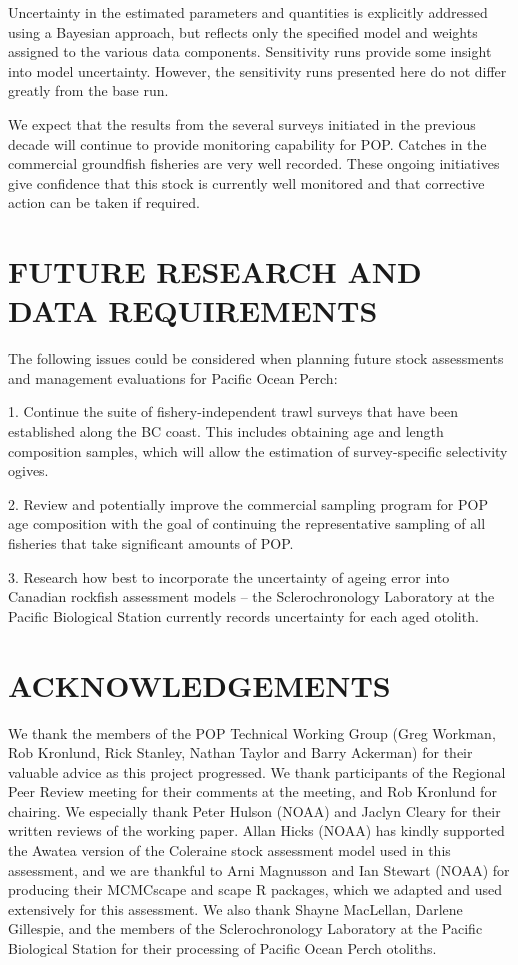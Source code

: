 Uncertainty in the estimated parameters and quantities is explicitly addressed using a Bayesian approach, but reflects only the specified model and weights assigned to the various data components.  Sensitivity runs provide some insight into model uncertainty.  However, the sensitivity runs presented here do not differ greatly from the base run.

We expect that the results from the several surveys initiated in the previous decade will continue to provide monitoring capability for POP. Catches in the commercial groundfish fisheries are very well recorded. These ongoing initiatives give confidence that this stock is currently well monitored and that corrective action can be taken if required.


\section{FUTURE RESEARCH AND DATA REQUIREMENTS}

The following issues could be considered when planning future stock assessments and management evaluations for Pacific Ocean Perch:

1. Continue the suite of fishery-independent trawl surveys that have been established along the BC coast. This includes obtaining age and length composition samples, which will allow the estimation of survey-specific selectivity ogives. 

2. Review and potentially improve the commercial sampling program for POP age composition with the goal of continuing the representative sampling of all fisheries that take significant amounts of POP.

3. Research how best to incorporate the uncertainty of ageing error into Canadian rockfish assessment models --  the Sclerochronology Laboratory at the Pacific Biological Station currently records uncertainty for each aged otolith.


\section{ACKNOWLEDGEMENTS}

We thank the members of the POP Technical Working Group (Greg Workman, Rob Kronlund, Rick Stanley, Nathan Taylor and Barry Ackerman) for their valuable advice as this project progressed. We thank participants of the Regional Peer Review meeting for their comments at the meeting, and Rob Kronlund for chairing. We especially thank Peter Hulson (NOAA) and Jaclyn Cleary for their written reviews of the working paper. Allan Hicks (NOAA) has kindly supported the Awatea version of the Coleraine stock assessment model used in this assessment, and we are thankful to Arni Magnusson and Ian Stewart (NOAA) for producing their MCMCscape and scape R packages, which we adapted and used extensively for this assessment. We also thank Shayne MacLellan, Darlene Gillespie, and the members of the Sclerochronology Laboratory at the Pacific Biological Station for their processing of Pacific Ocean Perch otoliths. 

